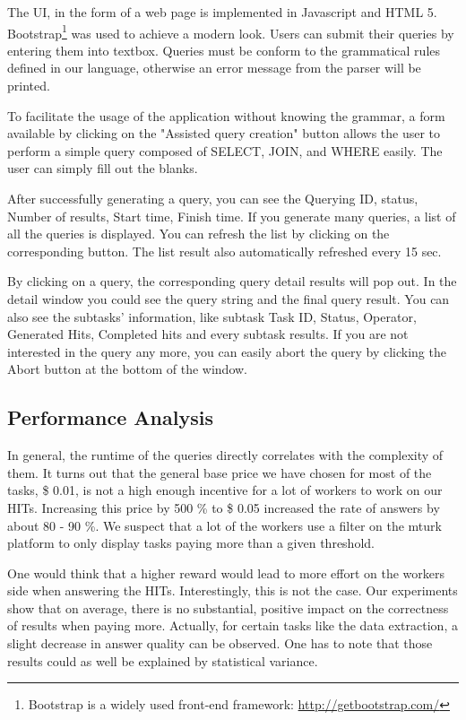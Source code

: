 \documentclass{article}
\begin{document}
The UI, in the form of a web page is implemented in Javascript and HTML 5.
Bootstrap\footnote{Bootstrap is a widely used front-end framework:
\url{http://getbootstrap.com/}} was used to achieve a modern look.
Users can submit their queries by entering them into textbox. Queries must be conform to the
grammatical rules defined in our language, otherwise an error message from the parser will be printed.

To facilitate the usage of the application without knowing the grammar, a form
available by clicking on the "Assisted query creation" button allows the user
to perform a simple query composed of SELECT, JOIN, and WHERE easily. The user
can simply fill out the blanks.

After successfully generating a query, you can see the Querying ID, status, Number of results, Start time, Finish time. If you generate many queries, a list of all the queries is displayed. You can refresh the list by clicking on the corresponding button. The list result also automatically refreshed every 15 sec.

By clicking on a query, the corresponding query detail results will pop out. In the detail window you could see the query string and the final query result. You can also see the subtasks' information, like subtask Task ID, Status, Operator, Generated Hits, Completed hits and every subtask results. If you are not interested in the query any more, you can easily abort the query by clicking the Abort button at the bottom of the window.

\subsection{Performance Analysis}
In general, the runtime of the queries directly correlates with the complexity of them.
It turns out that the general base price we have chosen for most of the tasks, \$ 0.01, is not a high enough incentive for a lot of workers to work on our HITs. Increasing this price by 500 \% to \$ 0.05 increased the rate of answers by about 80 - 90 \%. We suspect that a lot of the workers use a filter on the mturk platform to only display tasks paying more than a given threshold. 

One would think that a higher reward would lead to more effort on the workers side when answering the HITs. Interestingly, this is not the case. Our experiments show that on average, there is no substantial, positive impact on the correctness of results when paying more. Actually, for certain tasks like the data extraction, a slight decrease in answer quality can be observed. One has to note that those results could as well be explained by statistical variance.
\end{document}
